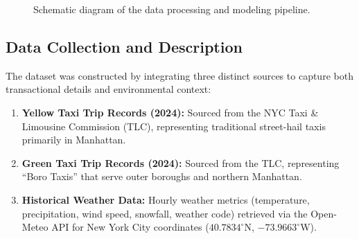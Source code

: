 \documentclass[11pt]{article}
\begin{document}
\begin{figure}[H]
\centering
{}
\caption{Schematic diagram of the data processing and modeling pipeline.}
\label{fig:methodology_pipeline}
\end{figure}

\subsection{Data Collection and Description}
The dataset was constructed by integrating three distinct sources to capture both transactional details and environmental context:

\begin{enumerate}
    \item \textbf{Yellow Taxi Trip Records (2024):} Sourced from the NYC Taxi \& Limousine Commission (TLC), representing traditional street-hail taxis primarily in Manhattan.
    \item \textbf{Green Taxi Trip Records (2024):} Sourced from the TLC, representing ``Boro Taxis'' that serve outer boroughs and northern Manhattan.
    \item \textbf{Historical Weather Data:} Hourly weather metrics (temperature, precipitation, wind speed, snowfall, weather code) retrieved via the Open-Meteo API for New York City coordinates ($40.7834^\circ$N, $-73.9663^\circ$W).
\end{enumerate}
\end{document}
